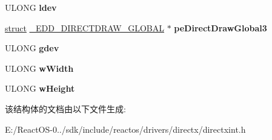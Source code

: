 \begin{DoxyCompactItemize}
\mbox{\label{struct___e_d_d___s_u_r_f_a_c_e_a4fc49a6d9458d41c5b717d5af656dd4b}} 
U\+L\+O\+NG {\bfseries ldev}
\item 
\mbox{\label{struct___e_d_d___s_u_r_f_a_c_e_ac4dd5de383278c3fb2b384db93b5a438}} 
\hyperlink{interfacestruct}{struct} \hyperlink{struct___e_d_d___d_i_r_e_c_t_d_r_a_w___g_l_o_b_a_l}{\+\_\+\+E\+D\+D\+\_\+\+D\+I\+R\+E\+C\+T\+D\+R\+A\+W\+\_\+\+G\+L\+O\+B\+AL} $\ast$ {\bfseries pe\+Direct\+Draw\+Global3}
\item 
\mbox{\label{struct___e_d_d___s_u_r_f_a_c_e_a73a152994b7acd57b509d6e46d2dd9df}} 
U\+L\+O\+NG {\bfseries gdev}
\item 
\mbox{\label{struct___e_d_d___s_u_r_f_a_c_e_ab6943676d115db061a14f229441f7dee}} 
U\+L\+O\+NG {\bfseries w\+Width}
\item 
\mbox{\label{struct___e_d_d___s_u_r_f_a_c_e_ad8db62d15658defa2176dd0bafb366f8}} 
U\+L\+O\+NG {\bfseries w\+Height}
\end{DoxyCompactItemize}


该结构体的文档由以下文件生成\+:\begin{DoxyCompactItemize}
\item 
E\+:/\+React\+O\+S-\/0../sdk/include/reactos/drivers/directx/directxint.\+h\end{DoxyCompactItemize}
